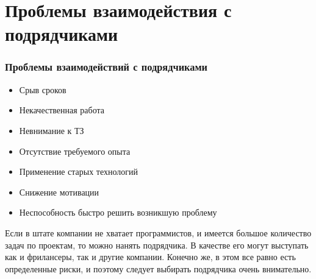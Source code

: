 \documentclass{../industrial-development}
\begin{document}
\section{Проблемы взаимодействия с подрядчиками}
\begin{frame} \frametitle{Проблемы взаимодействий с подрядчиками}

\begin{itemize}
 \item Срыв сроков 
 \item Некачественная работа
 \item Невнимание к ТЗ
 \item Отсутствие требуемого опыта
 \item Применение старых технологий
 \item Снижение мотивации
 \item Неспособность быстро решить возникшую проблему
  \end{itemize}
\end{frame}

\lecturenotes
Если в штате компании не хватает программистов, и имеется большое количество задач по проектам, то можно нанять подрядчика. В качестве его могут выступать как и фрилансеры, так и другие компании. Конечно же, в этом все равно есть определенные риски, и поэтому следует выбирать подрядчика очень внимательно. 

\begin{thebibliography}{99}
\end{thebibliography}
\end{document}

